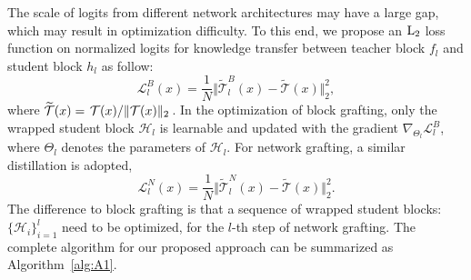 \documentclass[letterpaper]{article} %
\begin{document}
{{        The scale of logits from different network architectures may have a large gap, which may result in optimization difficulty.
        To this end, we propose an $\rm{L}_2$ loss function on normalized logits for knowledge transfer between teacher block $f_l$ and student block $h_l$ as follow:
        \begin{equation} \label{eq:loss_block_graft}
            \mathcal{L}_l^{B}(x) = \frac{1}{N} \Vert \widetilde{\mathcal{T}}_l^B(x) - \widetilde{\mathcal{T}}(x) \Vert_2^2,
        \end{equation}
        where $\widetilde{\mathcal{T}}(x) = \left.{\mathcal{T}(x)}\middle/{\Vert \mathcal{T}(x) \Vert_2}\right.$.
        In the optimization of block grafting, only the wrapped student block $\mathcal{H}_l$ is learnable and updated with the gradient $\nabla_{\Theta_l} \mathcal{L}_l^{B}$, where $\Theta_l$ denotes the parameters of $\mathcal{H}_l$.
        For network grafting, a similar distillation is adopted,
        \begin{equation} \label{eq:loss_net_graft}
            \mathcal{L}_l^{N}(x) = \frac{1}{N} \Vert \widetilde{\mathcal{T}}_l^N(x) - \widetilde{\mathcal{T}}(x) \Vert_2^2.
        \end{equation}
        The difference to block grafting is that a sequence of wrapped student blocks: $\{ \mathcal{H}_i \}_{i=1}^l$ need to be optimized, for the $l$-th step of network grafting.
        The complete algorithm for our proposed approach can be summarized as Algorithm~\ref{alg:A1}.

    }
}
\end{document}
